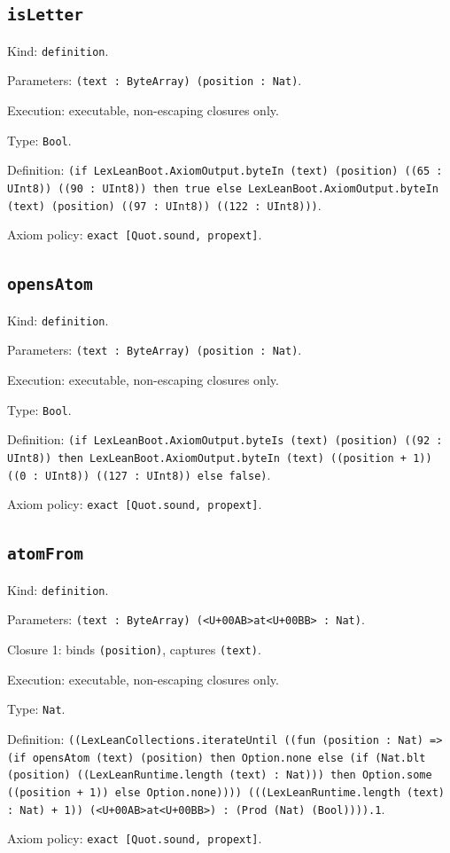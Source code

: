 \documentclass[11pt]{article}
\begin{document}
\subsection*{\texttt{isLetter}}
\noindent Kind: \texttt{definition}.\par
\noindent Parameters: \texttt{(text : ByteArray) (position : Nat)}.\par
\noindent Execution: executable, non-escaping closures only.\par
\noindent Type: \texttt{Bool}.\par
\noindent Definition: \texttt{(if LexLeanBoot.AxiomOutput.byteIn (text) (position) ((65 : UInt8)) ((90 : UInt8)) then true else LexLeanBoot.AxiomOutput.byteIn (text) (position) ((97 : UInt8)) ((122 : UInt8)))}.\par
\noindent Axiom policy: \texttt{exact [Quot.sound, propext]}.\par
\subsection*{\texttt{opensAtom}}
\noindent Kind: \texttt{definition}.\par
\noindent Parameters: \texttt{(text : ByteArray) (position : Nat)}.\par
\noindent Execution: executable, non-escaping closures only.\par
\noindent Type: \texttt{Bool}.\par
\noindent Definition: \texttt{(if LexLeanBoot.AxiomOutput.byteIs (text) (position) ((92 : UInt8)) then LexLeanBoot.AxiomOutput.byteIn (text) ((position + 1)) ((0 : UInt8)) ((127 : UInt8)) else false)}.\par
\noindent Axiom policy: \texttt{exact [Quot.sound, propext]}.\par
\subsection*{\texttt{atomFrom}}
\noindent Kind: \texttt{definition}.\par
\noindent Parameters: \texttt{(text : ByteArray) (<U+00AB>at<U+00BB> : Nat)}.\par
\noindent Closure 1: binds \texttt{(position)}, captures \texttt{(text)}.\par
\noindent Execution: executable, non-escaping closures only.\par
\noindent Type: \texttt{Nat}.\par
\noindent Definition: \texttt{((LexLeanCollections.iterateUntil ((fun (position : Nat) => (if opensAtom (text) (position) then Option.none else (if (Nat.blt (position) ((LexLeanRuntime.length (text) : Nat))) then Option.some ((position + 1)) else Option.none)))) (((LexLeanRuntime.length (text) : Nat) + 1)) (<U+00AB>at<U+00BB>) : (Prod (Nat) (Bool)))).1}.\par
\noindent Axiom policy: \texttt{exact [Quot.sound, propext]}.\par
\end{document}
